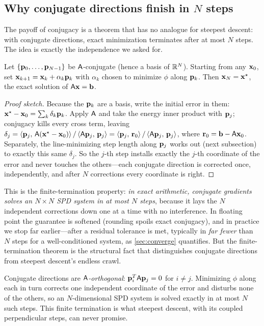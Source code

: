 \subsection{Why conjugate directions finish in \texorpdfstring{$N$}{N} steps}
\label{sec:finite}

The payoff of conjugacy is a theorem that has no analogue for steepest descent:
with conjugate directions, exact minimization terminates after at most $N$ steps.
The idea is exactly the independence we asked for.

\begin{theorem}
\label{thm:finite}
Let $\{\mathbf{p}_0,\dots,\mathbf{p}_{N-1}\}$ be $\mathsf{A}$-conjugate (hence a basis of
$\mathbb{R}^N$). Starting from any $\mathbf{x}_0$, set
$\mathbf{x}_{k+1}=\mathbf{x}_k+\alpha_k\mathbf{p}_k$ with $\alpha_k$ chosen to minimize $\phi$ along
$\mathbf{p}_k$. Then $\mathbf{x}_N=\mathbf{x}^\star$, the exact solution of $\mathsf{A}\mathbf{x}=\mathbf{b}$.
\end{theorem}

\begin{proof}[Proof sketch]
Because the $\mathbf{p}_k$ are a basis, write the initial error in them:
$\mathbf{x}^\star-\mathbf{x}_0=\sum_{k}\delta_k\mathbf{p}_k$. Apply $\mathsf{A}$ and take the energy inner
product with $\mathbf{p}_j$; conjugacy kills every cross term, leaving
$\delta_j=\left\langle \mathbf{p}_j,\, \mathsf{A}(\mathbf{x}^\star-\mathbf{x}_0)\right\rangle/\left\langle \mathsf{A}\mathbf{p}_j,\, \mathbf{p}_j\right\rangle
=\left\langle \mathbf{p}_j,\, \mathbf{r}_0\right\rangle/\left\langle \mathsf{A}\mathbf{p}_j,\, \mathbf{p}_j\right\rangle$, where $\mathbf{r}_0=\mathbf{b}-\mathsf{A}\mathbf{x}_0$.
Separately, the line-minimizing step length along $\mathbf{p}_j$ works out (next
subsection) to exactly this same $\delta_j$. So the $j$-th step installs exactly
the $j$-th coordinate of the error and never touches the others---each conjugate
direction is corrected once, independently, and after $N$ corrections every
coordinate is right.
\end{proof}

This is the finite-termination property: \emph{in exact arithmetic, conjugate
gradients solves an $N\times N$ SPD system in at most $N$ steps}, because it lays
the $N$ independent corrections down one at a time with no interference. In
floating point the guarantee is softened (rounding spoils exact conjugacy), and
in practice we stop far earlier---after a residual tolerance is met, typically in
\emph{far fewer} than $N$ steps for a well-conditioned system, as
\cref{sec:converge} quantifies. But the finite-termination theorem is the
structural fact that distinguishes conjugate directions from steepest descent's
endless crawl.

\begin{keyidea}
Conjugate directions are \emph{$\mathsf{A}$-orthogonal}: $\mathbf{p}_i^{T}\mathsf{A}\mathbf{p}_j=0$
for $i\neq j$. Minimizing $\phi$ along each in turn corrects one independent
coordinate of the error and disturbs none of the others, so an $N$-dimensional
SPD system is solved exactly in at most $N$ such steps. This finite termination
is what steepest descent, with its coupled perpendicular steps, can never
promise.
\end{keyidea}

